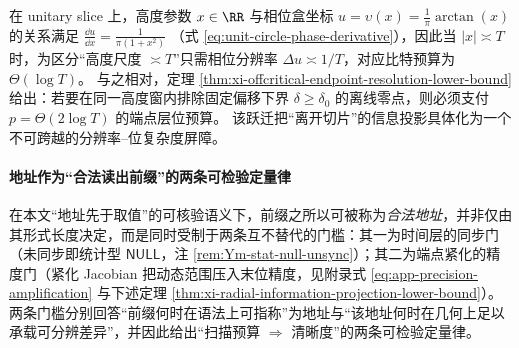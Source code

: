 \begin{remark}\label{rem:xi-unitary-vs-offcritical-bit-gap}
在 unitary slice 上，高度参数 \(x\in\RR\) 与相位盒坐标 \(u=\upsilon(x)=\frac{1}{\pi}\arctan(x)\) 的关系满足
\(
\frac{\dd u}{\dd x}=\frac{1}{\pi(1+x^2)}
\)
（式 \eqref{eq:unit-circle-phase-derivative}），因此当 \(|x|\asymp T\) 时，为区分“高度尺度 \(\asymp T\)”只需相位分辨率 \(\Delta u\asymp 1/T\)，对应比特预算为 \(\Theta(\log T)\)。
与之相对，定理 \ref{thm:xi-offcritical-endpoint-resolution-lower-bound} 给出：若要在同一高度窗内排除固定偏移下界 \(\delta\ge\delta_0\) 的离线零点，则必须支付 \(p=\Theta(2\log T)\) 的端点层位预算。
该跃迁把“离开切片”的信息投影具体化为一个不可跨越的分辨率--位复杂度屏障。
\end{remark}

\paragraph{地址作为“合法读出前缀”的两条可检验定量律}\label{par:xi-legal-readout-prefix-two-laws}
在本文“地址先于取值”的可核验语义下，前缀之所以可被称为\emph{合法地址}，并非仅由其形式长度决定，而是同时受制于两条互不替代的门槛：其一为时间层的同步门（未同步即统计型 \(\mathsf{NULL}\)，注 \ref{rem:Ym-stat-null-unsync}）；其二为端点紧化的精度门（紧化 Jacobian 把动态范围压入末位精度，见附录式 \eqref{eq:app-precision-amplification} 与下述定理 \ref{thm:xi-radial-information-projection-lower-bound}）。
两条门槛分别回答“前缀何时在语法上可指称”为地址与“该地址何时在几何上足以承载可分辨差异”，并因此给出“扫描预算 \(\Rightarrow\) 清晰度”的两条可检验定量律。
